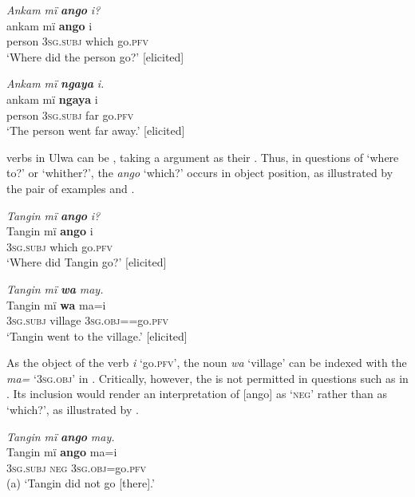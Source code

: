 \ea%
    \label{ex:syntax:42}
          \textit{Ankam mï} \textbf{\textit{ango}} \textit{i?}\\
\gll    ankam  mï      \textbf{ango}  i\\
    person  \textsc{3sg.subj}  which  go.\textsc{pfv}\\
\glt `Where did the person go?’ [elicited]
\z

\ea%
    \label{ex:syntax:43}
          \textit{Ankam mï} \textbf{\textit{ngaya}} \textit{i.}\\
\gll    ankam  mï      \textbf{ngaya}  i\\
    person  \textsc{3sg.subj}  far    go.\textsc{pfv}\\
\glt `The person went far away.’ [elicited]
\z

 verbs in Ulwa can be , taking a  argument as their . Thus, in questions of ‘where to?’ or ‘whither?’, the  \textit{ango} ‘which?’ occurs in object position, as illustrated by the pair of examples  and .

\ea%
    \label{ex:syntax:44}
          \textit{Tangin mï} \textbf{\textit{ango}} \textit{i?}\\
\gll    Tangin  mï      \textbf{ango}  i\\
    [name]  \textsc{3sg.subj}  which  go.\textsc{pfv}\\
\glt `Where did Tangin go?’ [elicited]
\z

\ea%
    \label{ex:syntax:45}
          \textit{Tangin mï} \textbf{\textit{wa}} \textit{may.}\\
\gll    Tangin  mï      \textbf{wa}    ma=i\\
    [name]  \textsc{3sg.subj}  village  \textsc{3sg.obj=}=go.\textsc{pfv}\\
\glt `Tangin went to the village.’ [elicited]
\z

As the object of the verb \textit{i} ‘go.\textsc{pfv}’, the noun \textit{wa} ‘village’ can be indexed with the  \textit{ma=} ‘\textsc{3sg.obj}’ in . Critically, however, the  is not permitted in questions such as in . Its inclusion would render an interpretation of [ango] as ‘\textsc{neg}’ rather than as ‘which?’, as illustrated by .

\ea%
    \label{ex:syntax:46}
          \textit{Tangin mï} \textbf{\textit{ango}} \textit{may.}\\
\gll    Tangin  mï      \textbf{ango}  ma=i\\
    [name]  \textsc{3sg.subj}  \textsc{neg}  \textsc{3sg.obj=}go.\textsc{pfv}\\
\glt    (a) ‘Tangin did not go [there].’

